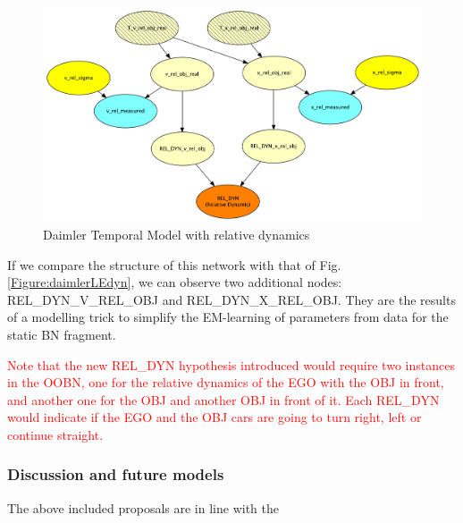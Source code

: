 {\begin{figure}
\begin{center}
\includegraphics[scale=0.4]{./figures/Daimlerreldyn.pdf}
\end{center}
\caption{\label{Figure:daimlerreldyn}Daimler Temporal Model with relative dynamics}
\end{figure}

If we compare the structure of this network with that of Fig. \ref{Figure:daimlerLEdyn}, we can observe two additional nodes:  REL\_DYN\_V\_REL\_OBJ and REL\_DYN\_X\_REL\_OBJ. They are the results of a modelling trick to simplify the EM-learning of parameters from data for the static BN fragment.

\textcolor{red}{Note that the new REL\_DYN hypothesis introduced would require two instances in the OOBN, one for the relative dynamics of the EGO with the OBJ in front, and another one for the OBJ and another OBJ in front of it. Each REL\_DYN would indicate if the EGO and the OBJ cars are going to turn right, left or continue straight.}
}

\subsubsection*{Discussion and future models}
The above included proposals are in line with the 
